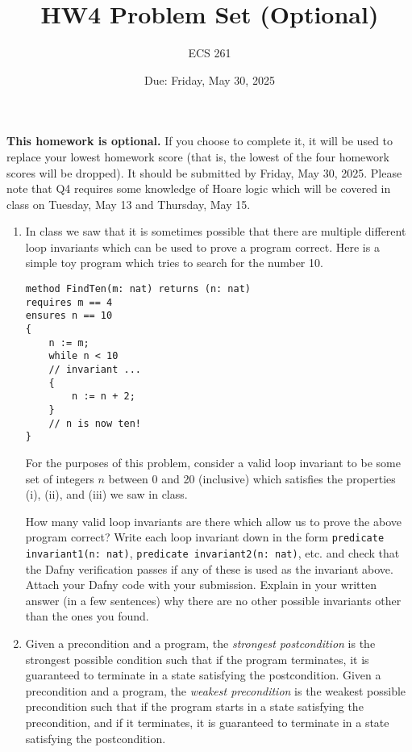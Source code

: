 \documentclass{article}
\begin{document}
\title{HW4 Problem Set (Optional)}
\author{ECS 261}
\date{Due: Friday, May 30, 2025}

\maketitle

\noindent
\textbf{This homework is optional.}
If you choose to complete it, it will be used to replace your lowest homework score (that is, the lowest of the four homework scores will be dropped).
It should be submitted by Friday, May 30, 2025.
Please note that Q4 requires some knowledge of Hoare logic which will be covered in class on Tuesday, May 13 and Thursday, May 15.

\noindent\hrulefill

\begin{enumerate}

\item
In class we saw that it is sometimes possible that there are multiple different loop invariants
which can be used to prove a program correct.
Here is a simple toy program which tries to search for the number 10.
\begin{verbatim}
method FindTen(m: nat) returns (n: nat)
requires m == 4
ensures n == 10
{
    n := m;
    while n < 10
    // invariant ...
    {
        n := n + 2;
    }
    // n is now ten!
}
\end{verbatim}

For the purposes of this problem, consider a valid loop invariant to be some set of integers
$n$ between 0 and 20 (inclusive)
which satisfies the properties (i), (ii), and (iii) we saw in class.

How many valid loop invariants are there which allow us to prove the above program correct?
Write each loop invariant down in the form \texttt{predicate invariant1(n: nat)}, \texttt{predicate invariant2(n: nat)}, etc. and check that the Dafny verification passes if any of these
is used as the invariant above.
Attach your Dafny code with your submission.
Explain in your written answer (in a few sentences) why there are no other possible invariants other than the ones you found.

\item
Given a precondition and a program, the \emph{strongest postcondition} is the strongest possible condition such that if the program terminates, it is guaranteed to terminate in a state satisfying the postcondition.
Given a precondition and a program, the \emph{weakest precondition} is the weakest possible precondition such that if the program starts in a state satisfying the precondition, and if it terminates, it is guaranteed to terminate in a state satisfying the postcondition.


\end{enumerate}
\end{document}
